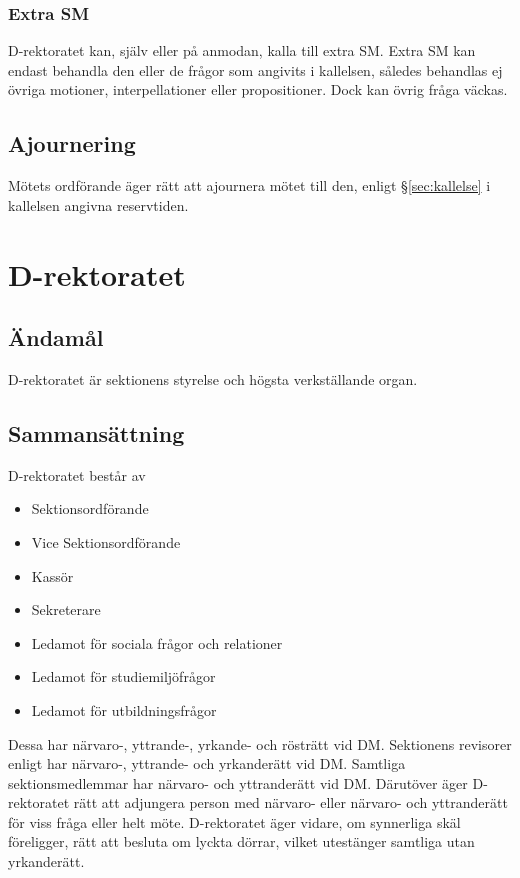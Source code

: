 \documentclass{dgovdoc}
\begin{document}
\subsubsection{Extra SM}

D-rektoratet kan, själv eller på anmodan, kalla till extra SM. Extra SM kan
endast behandla den eller de frågor som angivits i kallelsen, således behandlas
ej övriga motioner, interpellationer eller propositioner. Dock kan övrig fråga
väckas.

\subsection{Ajournering}
\label{sec:ajournering}

Mötets ordförande äger rätt att ajournera mötet till den, enligt 
\S\ref{sec:kallelse} i kallelsen angivna reservtiden.

\section{D-rektoratet}

\subsection{Ändamål}

D-rektoratet är sektionens styrelse och högsta verkställande organ.

\subsection{Sammansättning}

D-rektoratet består av

\begin{itemize}
  \item Sektionsordförande
  \item Vice Sektionsordförande
  \item Kassör
  \item Sekreterare
  \item Ledamot för sociala frågor och relationer
  \item Ledamot för studiemiljöfrågor
  \item Ledamot för utbildningsfrågor
\end{itemize}

Dessa har närvaro-, yttrande-, yrkande- och rösträtt vid DM. Sektionens
revisorer enligt har närvaro-, yttrande- och yrkanderätt vid DM. Samtliga sektionsmedlemmar har närvaro- och yttranderätt vid DM. Därutöver äger D-rektoratet rätt att adjungera person med närvaro-
eller närvaro- och yttranderätt för viss fråga eller helt möte. D-rektoratet
äger vidare, om synnerliga skäl föreligger, rätt att besluta om lyckta dörrar,
vilket utestänger samtliga utan yrkanderätt.
\end{document}

